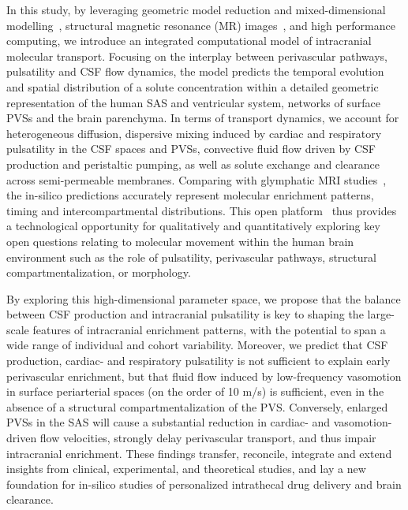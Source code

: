 \documentclass[fleqn,10pt]{wlscirep}
\begin{document}
In this study, by leveraging geometric model reduction and
mixed-dimensional modelling~\cite{masri2024modelling}, structural
magnetic resonance (MR) images~\cite{hodneland2019new}, and high
performance computing, we introduce an integrated computational model
of intracranial molecular transport. Focusing on the
interplay between perivascular pathways, pulsatility and CSF flow
dynamics, the model predicts the temporal evolution and spatial
distribution of a solute concentration within a detailed geometric
representation of the human SAS and ventricular system, networks of
surface PVSs and the brain parenchyma. In terms of transport dynamics,
we account for heterogeneous diffusion, dispersive mixing induced by
cardiac and respiratory pulsatility in the CSF spaces and PVSs,
convective fluid flow driven by CSF production and peristaltic
pumping, as well as solute exchange and clearance across
semi-permeable membranes. Comparing with glymphatic MRI
studies~\cite{ringstad2017glymphatic, ringstad2018brain,
  watts2019measuring}, the in-silico predictions accurately represent
molecular enrichment patterns, timing and intercompartmental
distributions. This open platform~\cite{ZENODO} thus provides a
technological opportunity for qualitatively and quantitatively
exploring key open questions relating to molecular movement within the
human brain environment such as the role of pulsatility, perivascular
pathways, structural compartmentalization, or morphology.

By exploring this high-dimensional parameter space, we propose that
the balance between CSF production and intracranial pulsatility is key
to shaping the large-scale features of intracranial enrichment
patterns, with the potential to span a wide range of individual and
cohort variability. Moreover, we predict that CSF production, cardiac-
and respiratory pulsatility is not sufficient to explain early
perivascular enrichment, but that fluid flow induced by low-frequency
vasomotion in surface periarterial spaces (on the order of 10 \textmu
m/s) is sufficient, even in the absence of a structural
compartmentalization of the PVS. Conversely, enlarged PVSs in the SAS
will cause a substantial reduction in cardiac- and vasomotion-driven
flow velocities, strongly delay perivascular transport, and thus
impair intracranial enrichment. These findings transfer, reconcile,
integrate and extend insights from clinical, experimental, and
theoretical studies, and lay a new foundation for in-silico studies of
personalized intrathecal drug delivery and brain clearance.
\end{document}
